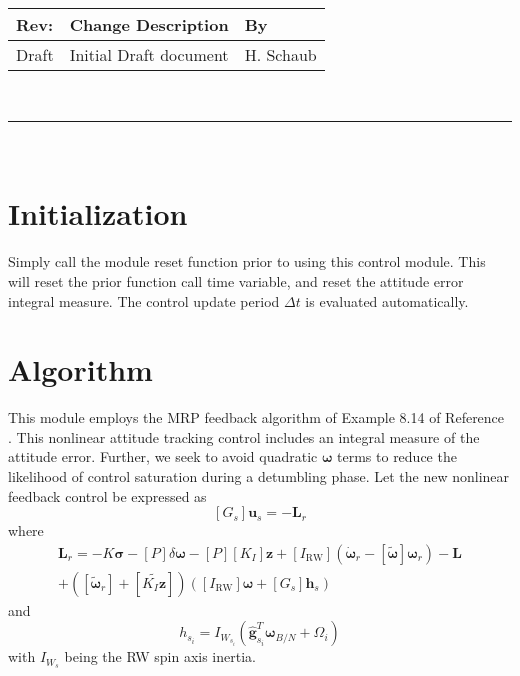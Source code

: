 \documentclass[]{BasiliskReportMemo}
\begin{document}
\makeCover


%
%
\pagestyle{empty}
{\renewcommand{\arraystretch}{2}
\noindent
\begin{longtable}{|p{0.5in}|p{4.5in}|p{1.14in}|}
\hline
{\bfseries Rev}: & {\bfseries Change Description} & {\bfseries By} \\
\hline
Draft & Initial Draft document & H. Schaub \\
\hline

\end{longtable}
}

\newpage
\setcounter{page}{1}
\pagestyle{fancy}

\tableofcontents
~\\ \hrule ~\\


\section{Initialization}
Simply call the module reset function prior to using this control module.  This will reset the prior function call time variable, and reset the attitude error integral measure.  The control update period $\Delta t$ is evaluated automatically.  

\section{Algorithm}
		 This module employs the MRP feedback algorithm of Example 8.14 of Reference .  This  nonlinear attitude tracking control includes an integral measure of the attitude error.  Further, we seek to avoid quadratic $\bm\omega$ terms to reduce the likelihood of control saturation during a detumbling phase.  Let the new nonlinear feedback control be expressed as
		\begin{equation}
			\label{eq:GusRW}
			[G_{s}]\bm u_{s} = -\bm L_{r} 
		\end{equation}
		where
		\begin{multline}
			\label{eq:Lr}
			\bm L_{r} =  -K \bm\sigma - [P] \delta\bm\omega - [P][K_{I}] \bm z  + [I_{\text{RW}}](\dot{\bm\omega}_{r} - [\tilde{\bm\omega}]\bm\omega_{r}) - \bm L
			\\
			+ ([\tilde{\bm \omega}_{r}] + [\widetilde{K_{I}\bm z}])
			\left([I_{\text{RW}}]\bm\omega + [G_{s}]\bm h_{s} \right)
		\end{multline}
		and 
		\begin{equation}
			h_{s_{i}} = I_{W_{s_{i}}} (\hat{\bm g}_{s_{i}}^{T} \bm\omega_{B/N} + \Omega_{i})
		\end{equation}
		with $I_{W_{s}}$ being the RW spin axis inertia.
\end{document}

